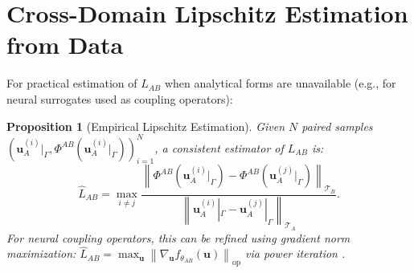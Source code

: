 \documentclass[11pt,a4paper]{article}
\newtheorem{proposition}[theorem]{Proposition}
\theoremstyle{definition}
\newcommand{\norm}[1]{\left\lVert#1\right\rVert}
\newcommand{\interface}{\Gamma}
\begin{document}
\section{Cross-Domain Lipschitz Estimation from Data}
\label{sec:app_lipschitz}

For practical estimation of $L_{AB}$ when analytical forms are unavailable (e.g., for neural surrogates used as coupling operators):

\begin{proposition}[Empirical Lipschitz Estimation]\label{prop:emp_lipschitz}
Given $N$ paired samples $(\mathbf{u}_A^{(i)}|_\interface, \Phi^{AB}(\mathbf{u}_A^{(i)}|_\interface))_{i=1}^N$, a consistent estimator of $L_{AB}$ is:
\begin{equation}
\hat{L}_{AB} = \max_{i \neq j} \frac{\norm{\Phi^{AB}(\mathbf{u}_A^{(i)}|_\interface) - \Phi^{AB}(\mathbf{u}_A^{(j)}|_\interface)}_{\mathcal{T}_B}}{\norm{\mathbf{u}_A^{(i)}|_\interface - \mathbf{u}_A^{(j)}|_\interface}_{\mathcal{T}_A}}.
\end{equation}
For neural coupling operators, this can be refined using gradient norm maximization: $\hat{L}_{AB} = \max_{\mathbf{u}} \norm{\nabla_{\mathbf{u}} f_{\theta_{AB}}(\mathbf{u})}_{\mathrm{op}}$ via power iteration \cite{Virmaux2018}.
\end{proposition}

\end{document}
